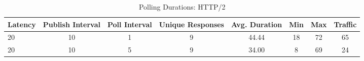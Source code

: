 
\begin{table}[H]
    \small\sffamily\centering\renewcommand{\arraystretch}{1.2}
    \caption{Polling Durations: HTTP/2}
    \label{undefined}

    
    \begin{tabular}{l|ccccccc}
        \hline
        \rowcolor{tableheadcolor}
         \bfseries Latency                                                    & \bfseries Publish Interval                                                                                                                                     & \bfseries Poll Interval                                                                                                          & \bfseries Unique Responses                                                                                                                                     & \bfseries Avg. Duration                                                                                                          & \bfseries Min                & \bfseries Max                & \bfseries Traffic                                                    \\
        \hline
 20                                                                   & 10                                                                                                                                                             & 1                                                                                                                                & 9                                                                                                                                                              & 44.44                                                                                                                            & 18                           & 72                           & 65                                                                   \\
 20                                                                   & 10                                                                                                                                                             & 5                                                                                                                                & 9                                                                                                                                                              & 34.00                                                                                                                            & 8                            & 69                           & 24                                                                   \\

\end{tabular}
\end{table}
